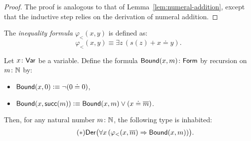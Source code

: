 \begin{proof}
    The proof is analogous to that of Lemma~\ref{lem:numeral-addition}, except that the inductive step relies on the derivation of numeral addition.
\end{proof}

\begin{defn}\label{defn:inequality}
    The \textsl{inequality formula} $\varphi_{<}(x,y)$ is defined as:
    \[
        \varphi_{<}(x,y)\equiv\exists z\,(s(z)+x\doteq y).
    \]
\end{defn}

\begin{thm}
    \label{thm:numeral-bounding}
    Let\/ $x\colon\fun{Var}$ be a variable. Define the formula\/ $\fun{Bound}(x,m)\colon\fun{Form}$ by recursion on\/ $m\colon\N$ by:
    \begin{itemize}
        \item $\mathsf{Bound}(x,0)\mathrel{\vcentcolon}\equiv\neg(0\doteq0)$,
        \item $\mathsf{Bound}(x,\mathsf{succ}(m))\mathrel{\vcentcolon}\equiv\mathsf{Bound}(x,m)\lor(x\doteq{\overline{m}})$.
    \end{itemize}
    Then, for any natural number\/ $m\colon\N$, the following type is inhabited:
    \begin{equation}\label{eq:bound}\tag{$\ast$}
        \mathsf{Der}\bigl(
            \forall x\,(\varphi_{<}(x,{\overline{m}})
            \mathrel{\Rightarrow}
            \mathsf{Bound}(x, m))
        \bigr).
    \end{equation}
\end{thm}

